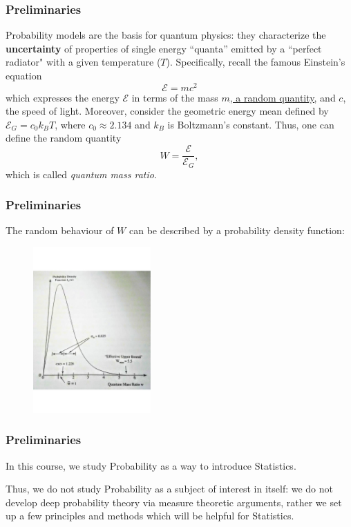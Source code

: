 \documentclass[notes=show,handout]{beamer}
\begin{document}
\begin{frame}
\frametitle{Preliminaries}

\begin{example} [Quanta]

Probability models are the basis for quantum physics: they characterize the \textbf{uncertainty} of properties of single energy ``quanta'' emitted by a ``perfect radiator" with a given temperature ($T$). Specifically, recall the famous Einstein's equation $$\boxed{\mathcal{E} = m c^2}$$ which expresses the energy $\mathcal{E}$  in terms of the mass \underline{$m$, a random quantity,} and $c$, the speed of light. Moreover, consider the geometric energy mean defined by ${\mathcal{E}_G} = c_0 k_B T$, where $c_0 \approx 2.134$ and $k_B$ is Boltzmann's constant. Thus, one can define the random quantity
$$
W = \frac{\mathcal{E}}{{\mathcal{E}_G}},
$$
which is called \textit{quantum mass ratio}.

\end{example}
\end{frame}



\begin{frame}
\frametitle{Preliminaries}

\begin{example} [cont'd]
The random behaviour of $W$ can be described by a probability density function:
\begin{figure}[h!]
\includegraphics[width=0.4\textwidth,height=0.6\textheight, angle = 0]{W.pdf}
\end{figure}

\end{example}
\end{frame}


\begin{frame}
\frametitle{Preliminaries}

In this course, we study \color{blue} Probability \color{black} as a way to introduce \color{blue} Statistics\color{black}. \\

\vspace{0.5cm}

Thus, we do not study Probability as a subject of interest in itself: we do not develop deep probability theory via measure theoretic arguments, 
rather we set up a few principles and methods which will be helpful for Statistics. 

\end{frame}
\end{document}
